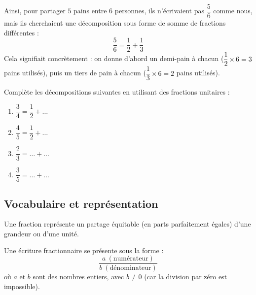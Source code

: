 \documentclass[../../syllabus_1.tex]{subfiles}
\begin{document}
\begin{itemize}
Ainsi, pour partager $5$ pains entre $6$ personnes, ils n'écrivaient pas $\dfrac{5}{6}$ comme nous, mais ils cherchaient une décomposition sous forme de somme de fractions différentes :
\begin{equation*}
    \dfrac{5}{6} = \dfrac{1}{2} + \dfrac{1}{3}
\end{equation*}
Cela signifiait concrètement : on donne d'abord un demi-pain à chacun ($\dfrac{1}{2} \times 6 = 3$ pains utilisés), puis un tiers de pain à chacun ($\dfrac{1}{3} \times 6 = 2$ pains utilisés).

 Complète les décompositions suivantes en utilisant des fractions unitaires :
    \begin{enumerate}[itemsep=1em, cols=2]
        \item $\displaystyle \dfrac{3}{4} = \dfrac{1}{2} + \ldots$
        
        \item $\displaystyle \dfrac{4}{5} = \dfrac{1}{2} + \ldots$
        
        \item $\displaystyle \dfrac{2}{3} = \ldots + \ldots$
        
        \item $\displaystyle \dfrac{3}{5} = \ldots + \ldots$
    \end{enumerate}

 
\subsection{Vocabulaire et représentation}
 
Une fraction représente un partage équitable (en parts parfaitement égales) d'une grandeur ou d'une unité.
 
Une écriture fractionnaire se présente sous la forme :
\begin{equation*}
    \dfrac{a \ (\text{numérateur})}{b \ (\text{dénominateur})}
\end{equation*}
où $a$ et $b$ sont des nombres entiers, avec $b \neq 0$ (car la division par zéro est impossible).

\newpage
\begin{center}
\end{center}
 

\end{itemize}
\end{document}
